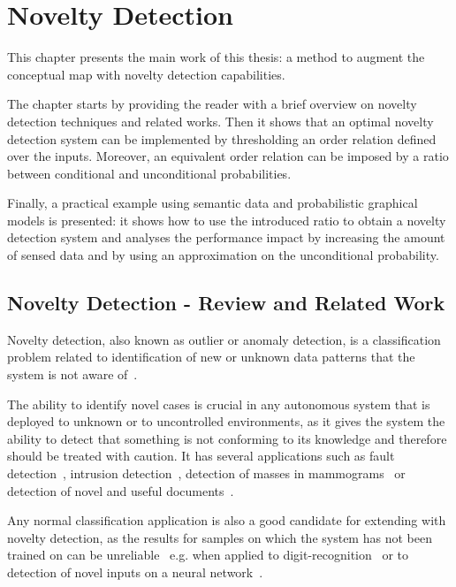 \chapter{Novelty Detection}\label{chap:novelty-intro}

This chapter presents the main work of this thesis: a method to augment the conceptual
map with novelty detection capabilities.

The chapter starts by providing the reader with a brief overview on novelty detection
techniques and related works. Then it shows that an optimal novelty detection system
can be implemented by thresholding an order relation defined over the inputs.
Moreover, an equivalent order relation can be imposed by a ratio between
conditional and unconditional probabilities.

Finally,  a practical example using semantic data and probabilistic graphical
models is presented: it shows how to use the introduced ratio to obtain a
novelty detection system and analyses the performance impact by increasing
the amount of sensed data and by using an approximation on the unconditional
probability.


\section{Novelty Detection - Review and Related Work}
Novelty detection, also known as outlier or anomaly detection, is a
classification problem related to identification of new or unknown data
patterns that the system is not aware of~\cite{markou2003novelty}.

The ability to identify novel cases is crucial in any autonomous system
that is deployed to unknown or to uncontrolled environments, as it gives the
system the ability to detect that something is not conforming to its knowledge and
therefore should be treated with caution.
It has several applications such as fault detection~\cite{tarassenko1999novelty},
intrusion detection~\cite{fan2001using},
detection of masses in mammograms~\cite{tarassenko1995novelty} or detection of
novel and useful documents~\cite{zhang2002novelty}.

Any normal classification application is also a good candidate for extending
with novelty detection, as the results for samples on which the system has not been
trained on can be unreliable~\cite{devarakota2008reliability}
e.g. when applied to digit-recognition~\cite{tax1998outlier}
or to detection of novel inputs on a neural network~\cite{bishop1994novelty}.

